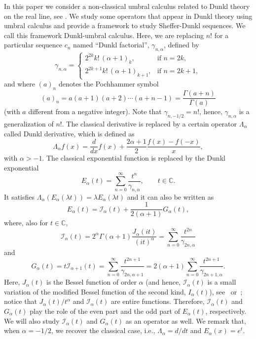 \documentclass[11pt]{article}
\theoremstyle{plain}
\theoremstyle{remark}
\numberwithin{equation}{section} %
\newcommand{\Ea}{E_{\alpha}}
\newcommand{\La}{\Lambda_{\alpha}}
\newcommand{\I}{\mathcal{I}}
\newcommand{\CC}{\mathbb{C}}
\begin{document}
In this paper we consider a non-classical umbral calculus related to Dunkl theory on the real line, see \cite{Du, Jeu, Ros}. We study some operators that appear in Dunkl theory using umbral calculus and provide a framework to study Sheffer-Dunkl sequences. We call this framework Dunkl-umbral calculus. Here, we are replacing $n!$ for a particular sequence $c_n$ named ``Dunkl factorial'', $\gamma_{n,\alpha}$, defined by
\begin{equation*}
\gamma_{n,\alpha} =
\begin{cases} 
  2^{2k}k!\,(\alpha+1)_k, & \text{if $n=2k$},\\
  2^{2k+1}k!\,(\alpha+1)_{k+1}, & \text{if $n=2k+1$},
\end{cases}
\end{equation*}
and where $(a)_n$ denotes the Pochhammer symbol
\[
  (a)_n = a(a+1)(a+2) \cdots (a+n-1) = \frac{\Gamma(a+n)}{\Gamma(a)}
\]
(with $a$ different from a negative integer). Note that $\gamma_{n,-1/2} = n!$, hence, $\gamma_{n,\alpha}$ is a generalization of $n!$. 
The classical derivative is replaced by a certain operator $\La$ called Dunkl derivative, which is defined as
\begin{equation*}
\La f(x) = \frac{d}{dx}f(x)+\frac{2\alpha+1}{2}\frac{f(x)-f(-x)}{x},
\end{equation*}
with $\alpha>-1$. The classical exponential function is replaced by the Dunkl exponential
\[
  \Ea(t) = \sum_{n=0}^\infty \frac{t^n}{\gamma_{n,\alpha}}, \qquad t \in \CC.
\]
It satisfies $\La(\Ea(\lambda t)) = \lambda \Ea(\lambda t)$ and it can also be written as
\[
\Ea(t) = \I_\alpha(t) + \frac{1}{2(\alpha+1)}G_{\alpha}(t), 
\]
where, also for $t \in \CC$,
\begin{equation}
\label{eq:def-I}
\I_\alpha(t) = 2^\alpha \Gamma(\alpha+1)\frac{J_\alpha(it)}{(it)^\alpha} 
= \sum_{n=0}^\infty \frac{t^{2n}}{\gamma_{2n,\alpha}}
\end{equation}
and
\begin{equation}
\label{eq:def-G}
G_\alpha(t) = t \I_{\alpha+1}(t) = \sum_{n=0}^\infty \frac{t^{2n+1}}{\gamma_{2n,\alpha+1}} 
= 2(\alpha + 1) \sum_{n=0}^\infty \frac{t^{2n+1}}{\gamma_{2n + 1,\alpha}}.
\end{equation}
Here, $J_\alpha(t)$ is the Bessel function of order $\alpha$ (and hence, $\I_\alpha(t)$ is a small variation of the modified Bessel function of the second kind, $I_\alpha(t)$), see~\cite{Wat} or~\cite{OlMa-NIST}; notice that $J_\alpha(t)/t^\alpha$ and $\I_\alpha(t)$ are entire functions. Therefore, $\I_\alpha(t)$ and $G_\alpha(t)$ play the role of the even part and the odd part of $\Ea(t)$, respectively. We will also study $\I_\alpha(t)$ and $G_{\alpha}(t)$ as an operator as well. We remark that, when $\alpha=-1/2$, we recover the classical case, i.e., $\La = d/dt$ and $\Ea(x) = e^t$.
\end{document}
